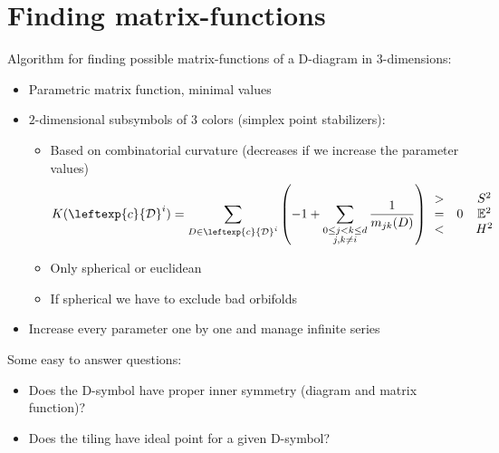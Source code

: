 \section{Finding matrix-functions}
\begin{frame}
  Algorithm for finding possible matrix-functions of a D-diagram in
  $3$-dimensions:
  \begin{itemize}
    \item Parametric matrix function, minimal values
    \item $2$-dimensional subsymbols of 3 colors (simplex point stabilizers):
      \begin{itemize}
	\item Based on combinatorial curvature (decreases if we increase the
	  parameter values)
	  \begin{align*}
	    K(\leftexp{c}{\mathcal{D}}^i)=\sum_{D\in
	    \leftexp{c}{\mathcal{D}}^i}\left(-1+\sum_{\substack{0\le j<k\le d \\
	    j,k\ne i}}\frac{1}{m_{jk}(D)}\right)
	    \begin{array}{cccc}
	      > & & S^2 \\
	      = & 0 & \mathbb{E}^2 \\
	      < & & H^2
	    \end{array}
	  \end{align*}
	\item Only spherical or euclidean
	\item If spherical we have to exclude bad orbifolds
      \end{itemize}
    \item Increase every parameter one by one and manage infinite series
  \end{itemize}
  Some easy to answer questions:
  \begin{itemize}
    \item Does the D-symbol have proper inner symmetry (diagram and matrix function)?
    \item Does the tiling have ideal point for a given D-symbol?
  \end{itemize}
\end{frame}

